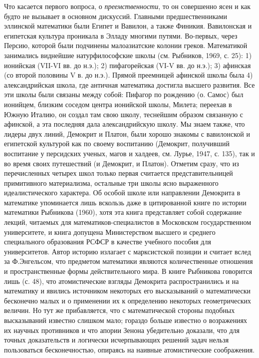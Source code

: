 Что касается первого вопроса, о \emph{преемственности}, то он
совершенно ясен и как будто не вызывает в основном дискуссий. Главными
предшественниками эллинской математики были Египет и Вавилон, а также
Финикия. Вавилонская и египетская культура проникала в Элладу многими
путями. Во-первых, через Персию, которой были подчинены малоазиатские
колонии греков. Математикой занимались виднейшие натурфилософские
школы (см. Рыбников, 1969, с. 25): 1) ионийская (VII-VI вв. до н.э.);
2) пифагорейская (VI-V вв. до н.э.); 3) афинская (со второй половины V
в. до н.э.). Прямой преемницей афинской школы была 4) александрийская
школа, где античная математика достигла высшего развития. Все эти
школы были связаны между собой: Пифагор по рождению (о. Самос) был
ионийцем, близким соседом центра ионийской школы, Милета; переехав в
Южную Италию, он создал там свою школу, теснейшим образом связанную с
афинской, а эта последняя дала александрийскую школу. Мы знаем также,
что лидеры двух линий, Демокрит и Платон, были хорошо знакомы с
вавилонской и египетской культурой как по своему воспитанию (Демокрит,
получивший воспитание у персидских ученых, магов и халдеев, см. Лурье,
1947, с. 135), так и во время своих путешествий (и Демокрит, и
Платон). Отметим сразу, что из перечисленных четырех школ только
первая считается представительницей примитивного материализма,
остальные три школы ясно выраженного идеалистического характера. Об
особой школе или направлении Демокрита в математике упоминается лишь
вскользь даже в цитированной книге по истории математики Рыбникова
(1960), хотя эта книга представляет собой содержание лекций, читаемых
для математиков-специалистов в Московском государственном
университете, и книга допущена Министерством высшего и среднего
специального образования РСФСР в качестве учебного пособия для
университетов. Автор историю излагает с марксистской позиции и считает
вслед за Ф.Энгельсом, что предметом математики являются
количественные отношения и пространственные формы действительного
мира. В книге Рыбникова говорится лишь (с. 48), что атомистические
взгляды Демокрита распространились и на математику и явились
источником некоторых его высказываний о математически бесконечно малых
и о применении их к определению некоторых геометрических величин. Но
тут же прибавляется, что с математической стороны подобных
высказываний известно слишком мало; гораздо больше известно о
возражениях их научных противников и что апории Зенона убедительно
доказали, что для точных доказательств и логически исчерпывающих
решений задач нельзя пользоваться бесконечностью, опираясь на наивные
атомистические соображения.


